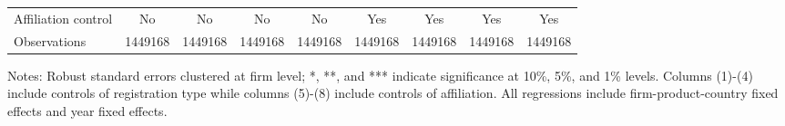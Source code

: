 \begin{table}
\begin{threeparttable}
\begin{tabular}{lcccccccc}
			Affiliation control & No & No & No & No &  Yes  & Yes & Yes  & Yes \\
			Observations & 1449168 & 1449168 & 1449168 & 1449168 & 1449168 & 1449168 & 1449168 & 1449168\\
			\bottomrule
		\end{tabular}
		\begin{tablenotes}
			\footnotesize
			\item Notes: Robust standard errors clustered at firm level; *, **, and *** indicate significance at 10\%, 5\%, and 1\% levels. Columns (1)-(4) include controls of registration type while columns (5)-(8) include controls of affiliation. All regressions include firm-product-country fixed effects and year fixed effects.
		\end{tablenotes}
	\end{threeparttable}
	\label{tab.robust.ownership}
\end{table}

